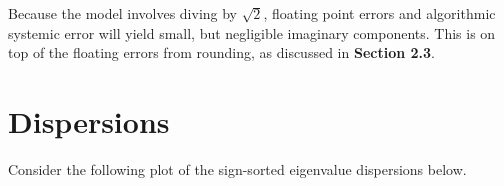 \begin{remark}
Because the model involves diving by $\sqrt{2}$, floating point errors and algorithmic systemic error will yield small, but negligible imaginary components.
This is on top of the floating errors from rounding, as discussed in \textbf{Section 2.3}.
\end{remark}

\newpage

\newpage


\newpage


\newpage


\newpage


\newpage

\newpage
\section{Dispersions}

Consider the following plot of the sign-sorted eigenvalue dispersions below.

